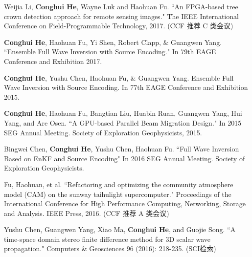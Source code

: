 \begin{resume}
\begin{publications}
   
  \end{publications}


  \begin{publications}
        \item Weijia Li, \textbf{Conghui He}, Wayne Luk and Haohuan Fu. ``An FPGA-based tree crown detection approach for remote sensing images." The IEEE International Conference on Field-Programmable Technology, 2017. (CCF 推荐 C 类会议)

 \item \textbf{Conghui He}, Haohuan Fu, Yi Shen, Robert Clapp, \& Guangwen Yang. ``Ensemble Full Wave Inversion with Source Encoding." In 79th EAGE Conference and Exhibition 2017. 

    \item \textbf{Conghui He}, Yushu Chen, Haohuan Fu, \& Guangwen Yang. Ensemble Full Wave Inversion with Source Encoding. In 77th EAGE Conference and Exhibition 2015.

    \item \textbf{Conghui He}, Haohuan Fu, Bangtian Liu, Huabin Ruan, Guangwen Yang, Hui Yang, and Are Osen. ``A GPU-based Parallel Beam Migration Design." In 2015 SEG Annual Meeting. Society of Exploration Geophysicists, 2015.

    \item Bingwei Chen, \textbf{Conghui He}, Yushu Chen, Haohuan Fu. ``Full Wave Inversion Based on EnKF and Source Encoding" In 2016 SEG Annual Meeting. Society of Exploration Geophysicists.

    \item Fu, Haohuan, et al. ``Refactoring and optimizing the community atmosphere model (CAM) on the sunway taihulight supercomputer." Proceedings of the International Conference for High Performance Computing, Networking, Storage and Analysis. IEEE Press, 2016. (CCF 推荐 A 类会议)

    \item Yushu Chen, Guangwen Yang, Xiao Ma, \textbf{Conghui He}, and Guojie Song. ``A time-space domain stereo finite difference method for 3D scalar wave propagation." Computers \& Geosciences 96 (2016): 218-235. (SCI检索)


\end{publications}
\end{resume}
